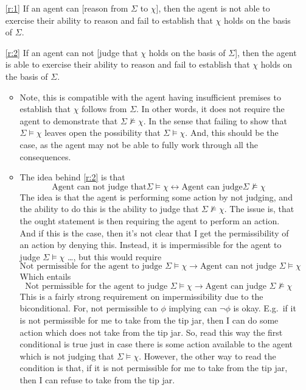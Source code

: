 \documentclass[10pt]{article}
\begin{document}
\begin{enumerate}
\item[\ref{r:1}] If an agent can [reason from \(\Sigma\) to \(\chi\)], then the agent is not able to exercise their ability to reason and fail to establish that \(\chi\) holds on the basis of \(\Sigma\).
\item[\ref{r:2}] If an agent can not [judge that \(\chi\) holds on the basis of \(\Sigma\)], then the agent is able to exercise their ability to reason and fail to establish that \(\chi\) holds on the basis of \(\Sigma\).
  \begin{itemize}
  \item {
      \color{red}
      Note, this is compatible with the agent having insufficient premises to establish that \(\chi\) follows from \(\Sigma\).
      In other words, it does not require the agent to demonstrate that \(\Sigma \nvDash \chi\).
      In the sense that failing to show that \(\Sigma \vDash \chi\) leaves open the possibility that \(\Sigma \vDash \chi\).
      And, this should be the case, as the agent may not be able to fully work through all the consequences.
    }
  \item The idea behind \ref{r:2} is that
    \[
      \text{Agent can not judge that} \Sigma \vDash \chi \leftrightarrow \text{Agent can judge} \Sigma \nvDash \chi
    \]
    The idea is that the agent is performing some action by not judging, and the ability to do this is the ability to judge that \(\Sigma \nvDash \chi\).
    The issue is, that the ought statement is then requiring the agent to perform an action.
    And if this is the case, then it's not clear that I get the permissibility of an action by denying this.
    Instead, it is impermissible for the agent to judge \(\Sigma \vDash \chi\) \dots, but this would require
    \[
      \text{Not permissible for the agent to judge } \Sigma \vDash \chi \rightarrow \text{Agent can not judge } \Sigma \vDash \chi
    \]
    Which entails
    \[
      \text{Not permissible for the agent to judge } \Sigma \vDash \chi \rightarrow \text{Agent can judge } \Sigma \nvDash \chi
    \]
    This is a fairly strong requirement on impermissibility due to the biconditional.
    For, not permissible to \(\phi\) implying can \(\lnot\phi\) is okay.
    E.g.\ if it is not permissible for me to take from the tip jar, then I can do some action which does not take from the tip jar.
    So, read this way the first conditional is true just in case there is some action available to the agent which is not judging that \(\Sigma \vDash \chi\).
    However, the other way to read the condition is that, if it is not permissible for me to take from the tip jar, then I can refuse to take from the tip jar.

\end{itemize}
\end{enumerate}
\end{document}
